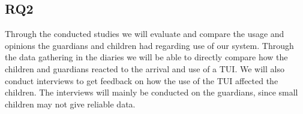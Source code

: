 \subsection{RQ2}
\label{sec: RQ3-methodology}

Through the conducted studies we will evaluate and compare the usage and opinions the guardians and children had regarding use of our system. Through the data gathering in the diaries we will be able to directly compare how the children and guardians reacted to the arrival and use of a TUI. We will also conduct interviews to get feedback on how the use of the TUI affected the children. The interviews will mainly be conducted on the guardians, since small children may not give reliable data.